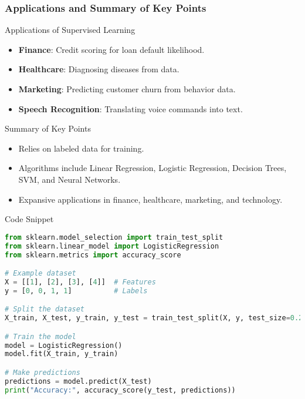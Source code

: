 \documentclass[aspectratio=169]{beamer}
\begin{document}
\begin{frame}[fragile]
    \frametitle{Applications and Summary of Key Points}
    
    \begin{block}{Applications of Supervised Learning}
        \begin{itemize}
            \item \textbf{Finance}: Credit scoring for loan default likelihood.
            \item \textbf{Healthcare}: Diagnosing diseases from data.
            \item \textbf{Marketing}: Predicting customer churn from behavior data.
            \item \textbf{Speech Recognition}: Translating voice commands into text.
        \end{itemize}
    \end{block}

    \begin{block}{Summary of Key Points}
        \begin{itemize}
            \item Relies on labeled data for training.
            \item Algorithms include Linear Regression, Logistic Regression, Decision Trees, SVM, and Neural Networks.
            \item Expansive applications in finance, healthcare, marketing, and technology.
        \end{itemize}
    \end{block}
    
    \begin{block}{Code Snippet}
        \begin{lstlisting}[language=Python]
from sklearn.model_selection import train_test_split
from sklearn.linear_model import LogisticRegression
from sklearn.metrics import accuracy_score

# Example dataset
X = [[1], [2], [3], [4]]  # Features
y = [0, 0, 1, 1]          # Labels

# Split the dataset
X_train, X_test, y_train, y_test = train_test_split(X, y, test_size=0.2)

# Train the model
model = LogisticRegression()
model.fit(X_train, y_train)

# Make predictions
predictions = model.predict(X_test)
print("Accuracy:", accuracy_score(y_test, predictions))
        \end{lstlisting}
    \end{block}
\end{frame}
\end{document}
